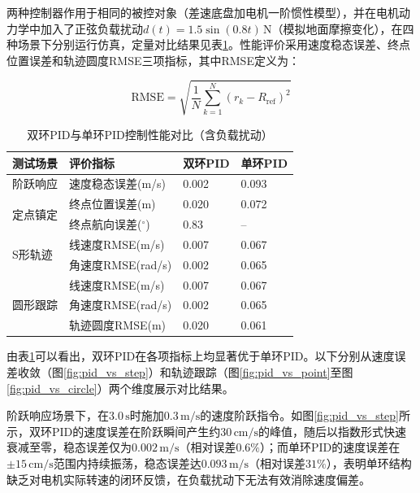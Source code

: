 {{    两种控制器作用于相同的被控对象（差速底盘加电机一阶惯性模型），并在电机动力学中加入了正弦负载扰动$d(t)=1.5\sin(0.8t)\,\mathrm{N}$（模拟地面摩擦变化），在四种场景下分别运行仿真，定量对比结果见表\ref{tab:dual_vs_single}。性能评价采用速度稳态误差、终点位置误差和轨迹圆度RMSE三项指标，其中RMSE定义为：

    \begin{equation}
    \mathrm{RMSE} = \sqrt{\frac{1}{N}\sum_{k=1}^{N}\left(r_k - R_{\mathrm{ref}}\right)^2}
    \label{eq:rmse}
    \end{equation}

    \begin{table}[htbp]
    \wuhao
    \centering
    \caption{双环PID与单环PID控制性能对比（含负载扰动）}
    \label{tab:dual_vs_single}
    \begin{tabular}{p{2cm}p{2.5cm}p{2.5cm}p{2.5cm}}
    \toprule
    测试场景 & 评价指标 & 双环PID & 单环PID \\
    \midrule
    阶跃响应 & 速度稳态误差(m/s) & 0.002 & 0.093 \\
    \multirow{2}{*}{定点镇定} & 终点位置误差(m) & 0.020 & 0.072 \\
    & 终点航向误差($^\circ$) & 0.83 & -- \\
    \multirow{2}{*}{S形轨迹} & 线速度RMSE(m/s) & 0.007 & 0.067 \\
    & 角速度RMSE(rad/s) & 0.002 & 0.065 \\
    \multirow{3}{*}{圆形跟踪} & 线速度RMSE(m/s) & 0.007 & 0.067 \\
    & 角速度RMSE(rad/s) & 0.002 & 0.065 \\
    & 轨迹圆度RMSE(m) & 0.020 & 0.061 \\
    \bottomrule
    \end{tabular}
    \end{table}

    由表\ref{tab:dual_vs_single}可以看出，双环PID在各项指标上均显著优于单环PID。以下分别从速度误差收敛（图\ref{fig:pid_vs_step}）和轨迹跟踪（图\ref{fig:pid_vs_point}至图\ref{fig:pid_vs_circle}）两个维度展示对比结果。

    阶跃响应场景下，在$3.0\,\mathrm{s}$时施加$0.3\,\mathrm{m/s}$的速度阶跃指令。如图\ref{fig:pid_vs_step}所示，双环PID的速度误差在阶跃瞬间产生约$30\,\mathrm{cm/s}$的峰值，随后以指数形式快速衰减至零，稳态误差仅为$0.002\,\mathrm{m/s}$（相对误差$0.6\%$）；而单环PID的速度误差在$\pm15\,\mathrm{cm/s}$范围内持续振荡，稳态误差达$0.093\,\mathrm{m/s}$（相对误差$31\%$），表明单环结构缺乏对电机实际转速的闭环反馈，在负载扰动下无法有效消除速度偏差。

}}
